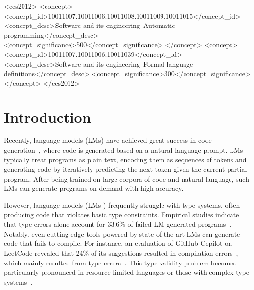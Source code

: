 \documentclass[manuscript,screen]{acmart}
\makeatletter
\providecommand{\DIFadd}[1]{{\protect\color{blue}\uwave{#1}}} %
\providecommand{\DIFdel}[1]{{\protect\color{red}\sout{#1}}} %
\providecommand{\DIFaddbegin}{} %
\providecommand{\DIFaddend}{} %
\providecommand{\DIFdelbegin}{} %
\providecommand{\DIFdelend}{} %
\providecommand{\DIFscaledelfig}{0.5}
\newlength{\DIFdelgraphicswidth} %
\newlength{\DIFdelgraphicsheight} %
\providecommand{\DIFaddincludegraphics}[2][]{{\color{blue}\fbox{\DIFOincludegraphics[#1]{#2}}}} %
\providecommand{\DIFdelincludegraphics}[2][]{%
\sbox{\DIFdelgraphicsbox}{\DIFOincludegraphics[#1]{#2}}%
\settoboxwidth{\DIFdelgraphicswidth}{\DIFdelgraphicsbox} %
\settoboxtotalheight{\DIFdelgraphicsheight}{\DIFdelgraphicsbox} %
\scalebox{\DIFscaledelfig}{%
\parbox[b]{\DIFdelgraphicswidth}{\usebox{\DIFdelgraphicsbox}\\[-\baselineskip] \rule{\DIFdelgraphicswidth}{0em}}\llap{\resizebox{\DIFdelgraphicswidth}{\DIFdelgraphicsheight}{%
\setlength{\unitlength}{\DIFdelgraphicswidth}%
\begin{picture}(1,1)%
\thicklines\linethickness{2pt} %
{\color[rgb]{1,0,0}\put(0,0){\framebox(1,1){}}}%
{\color[rgb]{1,0,0}\put(0,0){\line( 1,1){1}}}%
{\color[rgb]{1,0,0}\put(0,1){\line(1,-1){1}}}%
\end{picture}%
}\hspace*{3pt}}} %
} %
\DeclareRobustCommand{\DIFaddbegin}{\DIFOaddbegin \let\includegraphics\DIFaddincludegraphics} %
\DeclareRobustCommand{\DIFaddend}{\DIFOaddend \let\includegraphics\DIFOincludegraphics} %
\DeclareRobustCommand{\DIFdelbegin}{\DIFOdelbegin \let\includegraphics\DIFdelincludegraphics} %
\DeclareRobustCommand{\DIFdelend}{\DIFOaddend \let\includegraphics\DIFOincludegraphics} %
\let\sout@orig\sout %
\renewcommand{\sout}[1]{\ifmmode\text{\sout@orig{\ensuremath{#1}}}\else\sout@orig{#1}\fi} %
\makeatother
\begin{document}

\begin{CCSXML}
<ccs2012>
<concept>
<concept_id>10011007.10011006.10011008.10011009.10011015</concept_id>
<concept_desc>Software and its engineering~Automatic programming</concept_desc>
<concept_significance>500</concept_significance>
</concept>
<concept>
<concept_id>10011007.10011006.10011039</concept_id>
<concept_desc>Software and its engineering~Formal language definitions</concept_desc>
<concept_significance>300</concept_significance>
</concept>
</ccs2012>
\end{CCSXML}



\maketitle

\section{Introduction} \label{section:intro}
Recently, language models (LMs) have achieved great success in code generation~\cite{li2022competition, DBLP:conf/pldi/Xu0NH22, zheng2023codegeex, DBLP:journals/corr/abs-2108-07732}, where code is generated based on a natural language prompt.
%
LMs typically treat programs as plain text, encoding them as sequences of tokens and generating code by iteratively predicting the next token given the current partial program. After being trained on large corpora of code and natural language, such LMs can generate programs on demand with high accuracy.

However, \DIFdelbegin \DIFdel{language models (LMs ) }\DIFdelend \DIFaddbegin \DIFadd{LMs }\DIFaddend frequently struggle with type systems, often producing code that violates basic type constraints. 
Empirical studies indicate that type errors alone account for 33.6\% of failed LM-generated programs~\cite{DBLP:journals/ese/TambonDNKDA25, DBLP:journals/corr/abs-2407-06153}. 
Notably, even cutting-edge tools powered by state-of-the-art LMs can generate code that fails to compile.
For instance, an evaluation of GitHub Copilot on LeetCode revealed that 24\% of its suggestions resulted in compilation errors~\cite{DBLP:conf/msr/NguyenN22}, which mainly resulted from type errors~\cite{DBLP:journals/corr/abs-2504-09246}. 
This type validity problem becomes particularly pronounced in resource-limited languages or those with complex type systems~\cite{DBLP:journals/corr/abs-2406-00515,DBLP:journals/corr/abs-2410-03981}.
\end{document}
